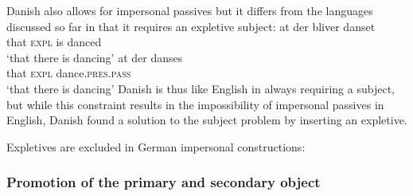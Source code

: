 Danish also allows for impersonal passives but it differs from the languages discussed so far in
that it requires an expletive subject:
\eal
\ex 
\gll at der bliver danset\\
     that \textsc{expl} is danced\\\danish
\glt `that there is dancing'
\ex
\gll at der danses\\
     that \textsc{expl} dance.\textsc{pres}.\textsc{pass}\\
\glt `that there is dancing'
\zl
Danish is thus like English in always requiring a subject, but while this constraint results in the
impossibility of impersonal passives in English, Danish found a solution to the subject problem by
inserting an expletive.

Expletives are excluded in German impersonal constructions:
\nocite{MOe2011a}
\z
{}




\subsubsection{Promotion of the primary and secondary object}

